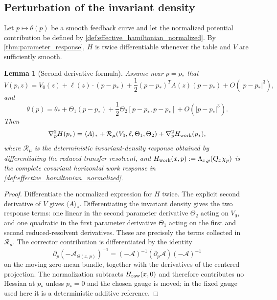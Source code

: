 \documentclass[12pt, letterpaper]{amsart}
\newcommand{\Acal}{\mathcal{A}}
\theoremstyle{plain}
\newtheorem{lemma}[theorem]{Lemma}
\theoremstyle{definition}
\theoremstyle{remark}
\begin{document}
\subsection{Perturbation of the invariant density}

Let $p\mapsto\theta(p)$ be a smooth feedback curve and let the normalized potential contribution be defined by \cref{def:effective_hamiltonian_normalized}.  By \cref{thm:parameter_response}, $H$ is twice differentiable whenever the table and $V$ are sufficiently smooth.

\begin{lemma}[Second derivative formula]
\label{lem:Hessian_formula}
Assume near $p=p_*$ that
\begin{equation}
    V(p,z)=V_0(z)+\ell(z)\cdot(p-p_*)+\frac12(p-p_*)^TA(z)(p-p_*)+O(|p-p_*|^3),
\end{equation}
and
\begin{equation}
    \theta(p)=\theta_*+\Theta_1(p-p_*)+\frac12\Theta_2[p-p_*,p-p_*]+O(|p-p_*|^3).
\end{equation}
Then
\begin{equation}
\label{eq:Hessian_formula_corrected}
    \nabla_p^2H(p_*)
    =\langle A\rangle_*
      +\mathcal R_{\mu}(V_0,\ell,\Theta_1,\Theta_2)
      +\nabla_p^2H_{\rm work}(p_*),
\end{equation}
where $\mathcal R_{\mu}$ is the deterministic invariant-density response obtained by differentiating the reduced transfer resolvent, and $H_{\rm work}(x,p):=\Lambda_{x,p}(Q_x\chi_p)$ is the complete covariant horizontal work response in \cref{def:effective_hamiltonian_normalized}.
\end{lemma}

\begin{proof}
Differentiate the normalized expression for $H$ twice.  The explicit second derivative of $V$ gives $\langle A\rangle_*$.  Differentiating the invariant density gives the two response terms: one linear in the second parameter derivative $\Theta_2$ acting on $V_0$, and one quadratic in the first parameter derivative $\Theta_1$ acting on the first and second reduced-resolvent derivatives.  These are precisely the terms collected in $\mathcal R_\mu$.  The corrector contribution is differentiated by the identity
\begin{equation}
    \partial_p(-\Acal_{\Theta(x,p)})^{-1}
    =(-\Acal)^{-1}(\partial_p\Acal)(-\Acal)^{-1}
\end{equation}
on the moving zero-mean bundle, together with the derivatives of the centered projection.  The normalization subtracts $H_{\rm raw}(x,0)$ and therefore contributes no Hessian at $p_*$ unless $p_*=0$ and the chosen gauge is moved; in the fixed gauge used here it is a deterministic additive reference.
\end{proof}
\end{document}
